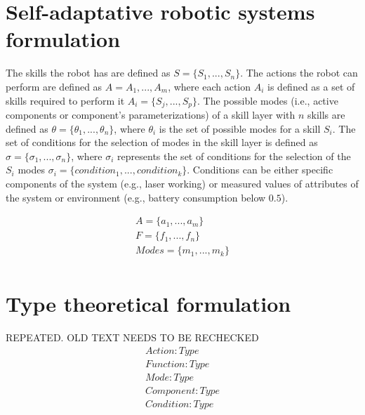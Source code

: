 

\section{Self-adaptative robotic systems formulation}

The skills the robot has are defined as $S = \{S_1, ..., S_n\}$. The actions the robot can perform are defined as $A = {A_1, ..., A_m}$, where each action $A_i$ is defined as a set of skills required to perform it $A_i=\{S_j,..., S_p\}$. The possible modes (i.e., active components or component's parameterizations) of a skill layer with $n$ skills are defined as $\theta = \{\theta_1, ..., \theta_n\}$, where $\theta_i$ is the set of possible modes for a skill $S_i$. The set of conditions for the selection of modes in the skill layer is defined as $\sigma = \{\sigma_1, ..., \sigma_n\}$, where $\sigma_i$ represents the set of conditions for the selection of the $S_i$ modes $\sigma_i = \{ condition_1, ..., condition_k\}$. Conditions can be either specific components of the system (e.g., laser working) or measured values of attributes of the system or environment (e.g., battery consumption below $0.5$).

\begin{gather}
    A = \{a_1, ..., a_m\} \\
    F = \{f_1, ..., f_n\} \\
    Modes = \{m_1, ..., m_k\}\\
\end{gather}

\section{Type theoretical formulation}
REPEATED. OLD TEXT NEEDS TO BE RECHECKED
\begin{gather}
    Action: Type \\
    Function: Type \\
    Mode: Type \\
    Component: Type \\
    Condition: Type 
\end{gather}

